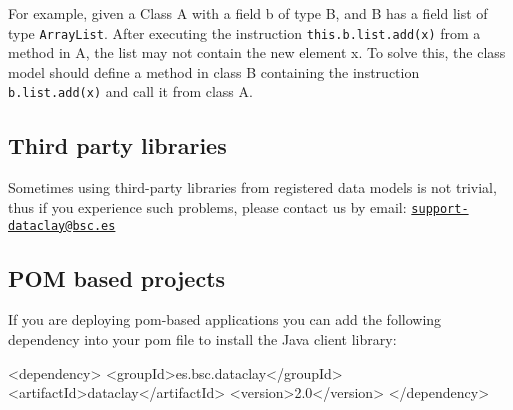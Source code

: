 For example, given a Class A with a field b of type B, and B has a field list of type \texttt{ArrayList}. After executing the instruction \texttt{this.b.list.add(x)} from a method in A, the list may not contain the new element x. To solve this, the class model should define a method in class B containing the instruction \texttt{b.list.add(x)} and call it from class A.

\subsection{Third party libraries}

Sometimes using third-party libraries from registered data models is not trivial, thus if you experience such problems, please contact us by email: \texttt{\href{mailto:support-dataclay@bsc.es}{support-dataclay@bsc.es}}

\subsection{POM based projects}
\label{sec:POMbasedProjects}

If you are deploying pom-based applications you can add the following dependency into your pom file to install the Java client library:

\begin{tBox}
\footnotesize
 \begin{bash}
  <dependency>
    <groupId>es.bsc.dataclay</groupId>
    <artifactId>dataclay</artifactId>
    <version>2.0</version>
  </dependency>
 \end{bash}
\end{tBox}

\FILTERING{

}
